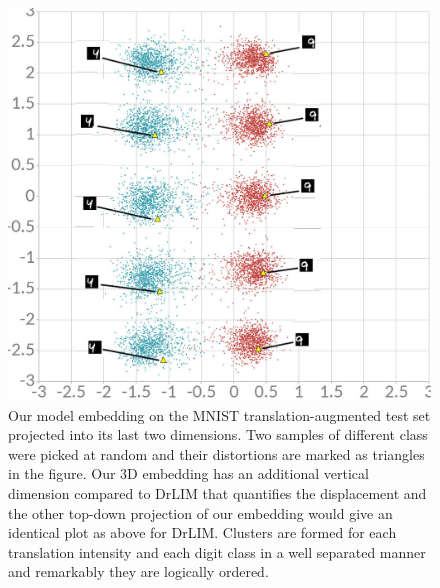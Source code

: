 \documentclass[a4paper,12pt]{report}
\begin{document}
\begin{figure}
    \centering
    \includegraphics[width=\textwidth]{thesis_figures/mnist_cl2d.jpg}
    \caption{Our model embedding on the MNIST translation-augmented test set projected into its last two dimensions.
    Two samples of different class were picked at random and their distortions are marked as triangles in the figure.
    Our 3D embedding has an additional vertical dimension compared to DrLIM that quantifies the displacement and the other top-down projection of our embedding would give an identical plot as above for DrLIM.
    Clusters are formed for each translation intensity and each digit class in a well separated manner and remarkably they are logically ordered.
    }
    \label{fig:mnist_cl2d_1}
\end{figure}
\end{document}

